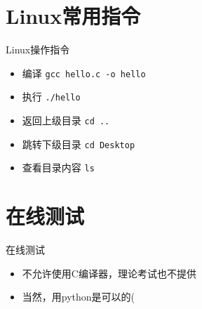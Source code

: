 \documentclass{myslide}
\begin{document}
\section{Linux常用指令}
\begin{frame}
\sectionpage
\end{frame}

\begin{frame}[fragile]{Linux操作指令}
\begin{itemize}
	\item 编译 \verb'gcc hello.c -o hello'
	\item 执行 \verb'./hello'
	\item 返回上级目录 \verb'cd ..'
	\item 跳转下级目录 \verb'cd Desktop'
	\item 查看目录内容 \verb'ls'
\end{itemize}
\end{frame}

\section{在线测试}
\begin{frame}
\sectionpage
\end{frame}

\begin{frame}{在线测试}
\begin{itemize}
	\item 不允许使用C编译器，理论考试也不提供
	\item 当然，用python是可以的(
\end{itemize}
\end{frame}
\end{document}
